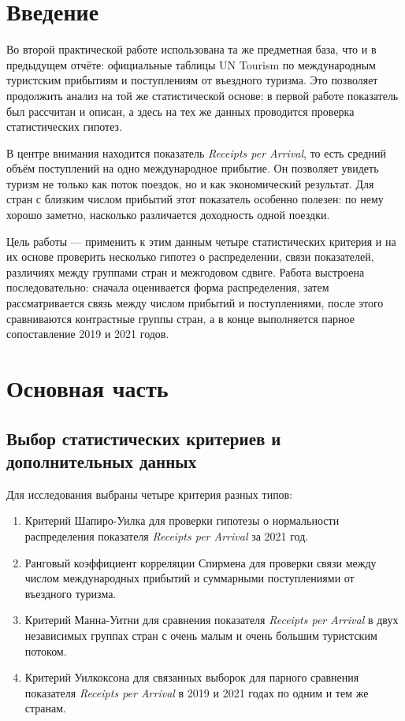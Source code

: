 \documentclass[14pt,a4paper]{extarticle}
\makeatletter
\renewcommand{\tableofcontents}{%
  \section*{\contentsname}%
  \@starttoc{toc}%
}
\makeatother
\begin{document}
\tableofcontents
\newpage

\section*{Введение}

Во второй практической работе использована та же предметная база, что и в предыдущем отчёте: официальные таблицы UN Tourism по международным туристским прибытиям и поступлениям от въездного туризма. Это позволяет продолжить анализ на той же статистической основе: в первой работе показатель был рассчитан и описан, а здесь на тех же данных проводится проверка статистических гипотез.

В центре внимания находится показатель \textit{Receipts per Arrival}, то есть средний объём поступлений на одно международное прибытие. Он позволяет увидеть туризм не только как поток поездок, но и как экономический результат. Для стран с близким числом прибытий этот показатель особенно полезен: по нему хорошо заметно, насколько различается доходность одной поездки.

Цель работы — применить к этим данным четыре статистических критерия и на их основе проверить несколько гипотез о распределении, связи показателей, различиях между группами стран и межгодовом сдвиге. Работа выстроена последовательно: сначала оценивается форма распределения, затем рассматривается связь между числом прибытий и поступлениями, после этого сравниваются контрастные группы стран, а в конце выполняется парное сопоставление 2019 и 2021 годов.

\section{Основная часть}

\subsection{Выбор статистических критериев и дополнительных данных}

Для исследования выбраны четыре критерия разных типов:
\begin{enumerate}[leftmargin=1.25cm]
    \item Критерий Шапиро-Уилка для проверки гипотезы о нормальности распределения показателя \textit{Receipts per Arrival} за 2021 год.
    \item Ранговый коэффициент корреляции Спирмена для проверки связи между числом международных прибытий и суммарными поступлениями от въездного туризма.
    \item Критерий Манна-Уитни для сравнения показателя \textit{Receipts per Arrival} в двух независимых группах стран с очень малым и очень большим туристским потоком.
    \item Критерий Уилкоксона для связанных выборок для парного сравнения показателя \textit{Receipts per Arrival} в 2019 и 2021 годах по одним и тем же странам.
\end{enumerate}
\end{document}
